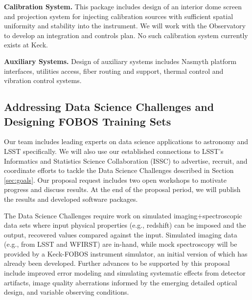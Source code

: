 \documentclass[oneside,11pt]{amsart}
\newcommand{\comment}[2][todo]{{\color{#1}[[{\bf #2}]]}}
\begin{document}
\noindent \textbf{Calibration System.} This package includes design of an interior dome screen and projection system for injecting calibration sources with sufficient spatial uniformity and stability into the instrument.  We will work with the Observatory to develop an integration and controls plan.  No such calibration system currently exists at Keck.

\noindent \textbf{Auxiliary Systems.} Design of auxiliary systems includes Nasmyth platform interfaces, utilities access, fiber routing and support, thermal control and vibration control systems.


\subsection{Addressing Data Science Challenges and Designing FOBOS Training Sets}
\label{sec:survey}

Our team includes leading experts on data science applications to astronomy and LSST specifically.  We will also use
our established connections to LSST's Informatics and Statistics Science Collaboration (ISSC) to advertise, recruit,
and coordinate efforts to tackle the Data Science Challenges described in Section \ref{sec:goals}.  Our proposal
request includes two open workshops to motivate progress and discuss results. At the end of the proposal period, we
will publish the results and developed software packages.

The Data Science Challenges require work on simulated imaging$+$spectroscopic data sets where input physical properties
(e.g., redshift) can be imposed and the output, recovered values compared against the input.  Simulated imaging data
(e.g., from LSST and WFIRST) are in-hand, while mock spectroscopy will be provided by a Keck-FOBOS instrument simulator,
an initial version of which has already been developed.  Further advances to be supported by this proposal include
improved error modeling and simulating systematic effects from detector artifacts, image quality aberrations informed
by the emerging detailed optical design, and variable observing conditions.
\end{document}
